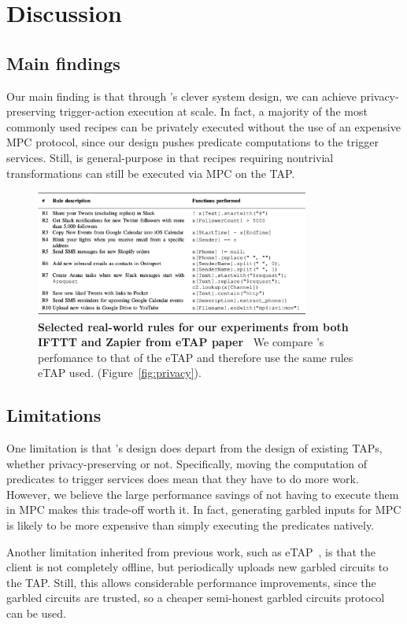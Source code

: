 \section{Discussion}
\label{sec:discussion}

\subsection{Main findings}
Our main finding is that through \sys's clever system design, we can achieve
privacy-preserving trigger-action execution at scale. In fact, a majority of the
most commonly used recipes can be privately executed without the use of an
expensive MPC protocol, since our design pushes predicate computations to the
trigger services. Still, \sys is general-purpose in that recipes requiring
nontrivial transformations can still be executed via MPC on the TAP.

\begin{figure}
\includegraphics[width=9cm]{../graphics/etap.png}
\caption{\textbf{Selected real-world rules for our experiments from both IFTTT and Zapier from eTAP
	paper~\cite{DBLP:conf/sp/ChenCWSCF21}} We compare \sys's perfomance to that of the eTAP and therefore use the same rules eTAP used. (Figure~\ref{fig:privacy}).}
\label{fig:eTAP-rules}
\end{figure}


\subsection{Limitations}
One limitation is that \sys's design does depart from the design of existing
TAPs, whether privacy-preserving or not. Specifically, moving the computation of
predicates to trigger services does mean that they have to do more
work. However, we believe the large performance savings of not having to execute
them in MPC makes this trade-off worth it. In fact, generating garbled inputs
for MPC is likely to be more expensive than simply executing the predicates
natively.

Another limitation inherited from previous work, such as
\textsf{eTAP}~\cite{DBLP:conf/sp/ChenCWSCF21}, is that the client is not
completely offline, but periodically uploads new garbled circuits to the
TAP. Still, this allows considerable performance improvements, since the garbled
circuits are trusted, so a cheaper semi-honest garbled circuits protocol can be
used.


